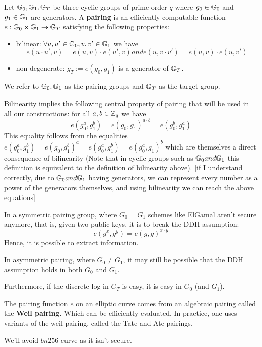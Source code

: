  \begin{defn}
  Let $\mathbb{G}_0, \mathbb{G}_1, \mathbb{G}_T$ be three cyclic groups of prime order $q$ where 
  $g_0\in\mathbb{G}_0$ and $g_1\in\mathbb{G}_1$ are generators. A \textbf{pairing} is an efficiently
  computable function $e: \mathbb{G}_0 \times \mathbb{G}_1 \to \mathbb{G}_T$ satisfying the 
  following properties:
  \begin{itemize}
    \item bilinear: $\forall u,u'\in\mathbb{G}_0, v,v'\in\mathbb{G}_1$  we have 
        $$ e(u\cdot u',v) = e(u,v) \cdot e(u',v) and  e(u,v\cdot v') = e(u,v)\cdot e(u,v')$$
    \item non-degenerate: $g_T := e(g_0,g_1)$  is a generator of $\mathbb{G}_T$.
  \end{itemize}
\end{defn}
We refer to $\mathbb{G}_0,\mathbb{G}_1$ as the pairing groups and $\mathbb{G}_T$ as the target group.

Bilinearity implies the following central property of pairing that will be used
in all our constructions: for all $a, b\in \mathbb{Z}_q$ we have
  $$ e(g_0^a,g_1^b)=e(g_0,g_1)^{a\cdot b}= e(g_0^b,g_1^a)$$
This equality follows from the equalities 
$e(g_0^a,g_1^b)=e(g_0,g_1^b)^a=e(g_0^a,g_1^b)=e(g_0^a,g_1)^b$
which are themselves a direct consequence of bilinearity (Note that in cyclic groups
 such as $\mathbb{G}_0 and \mathbb{G}_1$ this definition is equivalent to the definition of bilinearity above).
[if I understand correctly, due to $\mathbb{G}_0 and \mathbb{G}_1$ having generators, we can represent every number
as a power of the generators themselves, and using bilinearity we can reach the above equations]

In a symmetric pairing group, where $G_0 = G_1$ schemes like ElGamal aren't secure anymore,
that is, given two public keys, it is to break the DDH assumption: 
  $$ e(g^x,g^y) = e(g,g)^{x\cdot y}$$ 
Hence, it is possible to extract information. 

In asymmetric pairing, where $G_0 \neq G_1$, it may still be possible
that the DDH assumption holds in both $G_0$ and $G_1$. 

Furthermore, if the discrete log in $G_T$ is easy, it is easy in $G_0$ (and $G_1$).

\begin{rem}
  The pairing function $e$ on an elliptic curve comes from an algebraic pairing called the \textbf{Weil pairing}.
  Which can be efficiently evaluated. In practice, one uses variants of the weil 
  pairing, called the Tate and Ate pairings.
\end{rem}

We'll avoid $bn256$ curve as it isn't secure.


